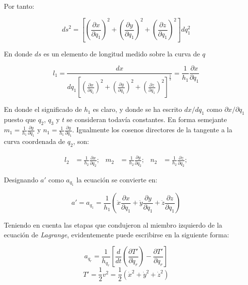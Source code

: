 Por tanto:

\begin{equation*}
    {ds}^2=\left[
        {\left(\frac{\partial x}{\partial q_1}\right)}^2+
        {\left(\frac{\partial y}{\partial q_1}\right)}^2+
        {\left(\frac{\partial z}{\partial q_1}\right)}^2
    \right] dq^2_1
\end{equation*}

En donde $ds$ es un elemento de longitud medido sobre la curva de $q$

\begin{equation*}
    l_1=\frac{dx}{dq_1{\left[
            {\left(\frac{\partial x}{\partial q_1}\right)}^2+
            {\left(\frac{\partial y}{\partial q_1}\right)}^2+
            {\left(\frac{\partial z}{\partial q_1}\right)}^2
        \right]}^\frac{1}{2}}
       =\frac{1}{h_1}\frac{\partial x}{\partial q_1}
\end{equation*}

En donde el significado de $h_1$ es claro, y donde se ha escrito $dx/dq_1$ como
$\partial x/\partial q_1$ puesto que $q_2$, $q_3$ y $t$ se consideran todavía
constantes. En forma semejante
$m_1=\frac{1}{h_1}\frac{\partial y}{\partial q_1}$ y
$n_1=\frac{1}{h_1}\frac{\partial y}{\partial q_1}$. Igualmente los cosenos
directores de la tangente a la curva coordenada de $q_2$, son:

\begin{align*}
    l_2&=\frac{1}{h_2}\frac{\partial x}{\partial q_2}; &
    m_2&=\frac{1}{h_2}\frac{\partial y}{\partial q_2}; &
    n_2&=\frac{1}{h_2}\frac{\partial z}{\partial q_2};
\end{align*}

Designando $a'$ como $a_{q_1}$ la ecuación se convierte en:

\begin{equation*}
    a'=a_{q_1}=\frac{1}{h_1}\left(
        \ddot{x}\frac{\partial x}{\partial q_1}+
        \ddot{y}\frac{\partial y}{\partial q_1}+
        \ddot{z}\frac{\partial z}{\partial q_1}
    \right)
\end{equation*}

Teniendo en cuenta las etapas que condujeron al miembro izquierdo de la ecuación
de \emph{Lagrange}, evidentemente puede escribirse en la siguiente forma:

\begin{equation*}
    a_{q_r}=\frac{1}{h_{q_r}}\left[
        \frac{d}{dt}\left(\frac{\partial T'}{\partial\dot{q}_r}\right)-
        \frac{\partial T'}{\partial q_r}
    \right]
\end{equation*}
\begin{equation*}
    T'=\frac{1}{2}v^2=\frac{1}{2}(\dot{x}^2+\dot{y}^2+\dot{z}^2)
\end{equation*}

